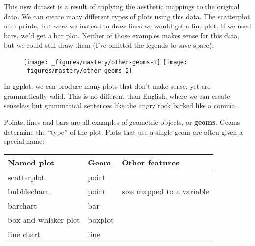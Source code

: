 This new dataset is a result of applying the aesthetic mappings to the
original data. We can create many different types of plots using this
data. The scatterplot uses points, but were we instead to draw lines we
would get a line plot. If we used bars, we'd get a bar plot. Neither of
those examples makes sense for this data, but we could still draw them
(I've omitted the legends to save space):

\begin{Shaded}
\begin{Highlighting}[]
 
\StringTok{  }\NormalTok{() +}\StringTok{ }
\StringTok{  }\NormalTok{(} \NormalTok{)}
 
\StringTok{  }\NormalTok{(} \NormalTok{, } \NormalTok{, } \NormalTok{) +}\StringTok{ }
\StringTok{  }\NormalTok{(} \NormalTok{)}
\end{Highlighting}
\end{Shaded}

\begin{figure}[H]
  \texttt{[image: \_figures/mastery/other-geoms-1]}%
  \texttt{[image: \_figures/mastery/other-geoms-2]}
\end{figure}

In ggplot, we can produce many plots that don't make sense, yet are
grammatically valid. This is no different than English, where we can
create senseless but grammatical sentences like the angry rock barked
like a comma.

Points, lines and bars are all examples of geometric objects, or
\textbf{geoms}. Geoms determine the ``type'' of the plot. Plots that use
a single geom are often given a special name:

\begin{longtable}[c]{@{}lll@{}}
\toprule
Named plot & Geom & Other features\tabularnewline
\midrule
\endhead
scatterplot & point &\tabularnewline
bubblechart & point & size mapped to a variable\tabularnewline
barchart & bar &\tabularnewline
box-and-whisker plot & boxplot &\tabularnewline
line chart & line &\tabularnewline
\bottomrule
\end{longtable}

